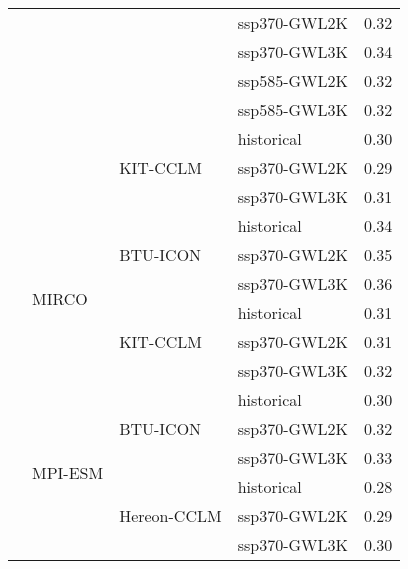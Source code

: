 \begin{table}[!htbp]
{\begin{tabular}{lll|l|r}
 &  &  & ssp370-GWL2K & 0.32 \\
 &  &  & ssp370-GWL3K & 0.34 \\
 &  &  & ssp585-GWL2K & 0.32 \\
 &  &  & ssp585-GWL3K & 0.32 \\
\cmidrule(lr){3-5}
 &  & \multirow{3}{*}{KIT-CCLM} & historical & 0.30 \\
 &  &  & ssp370-GWL2K & 0.29 \\
 &  &  & ssp370-GWL3K & 0.31 \\
\cmidrule(lr){3-5}
\cmidrule(lr){2-5}
 & \multirow{6}{*}{MIRCO} & \multirow{3}{*}{BTU-ICON} & historical & 0.34 \\
 &  &  & ssp370-GWL2K & 0.35 \\
 &  &  & ssp370-GWL3K & 0.36 \\
\cmidrule(lr){3-5}
 &  & \multirow{3}{*}{KIT-CCLM} & historical & 0.31 \\
 &  &  & ssp370-GWL2K & 0.31 \\
 &  &  & ssp370-GWL3K & 0.32 \\
\cmidrule(lr){3-5}
\cmidrule(lr){2-5}
 & \multirow{6}{*}{MPI-ESM} & \multirow{3}{*}{BTU-ICON} & historical & 0.30 \\
 &  &  & ssp370-GWL2K & 0.32 \\
 &  &  & ssp370-GWL3K & 0.33 \\
\cmidrule(lr){3-5}
 &  & \multirow{3}{*}{Hereon-CCLM} & historical & 0.28 \\
 &  &  & ssp370-GWL2K & 0.29 \\
 &  &  & ssp370-GWL3K & 0.30 \\
\bottomrule
\end{tabular}
}
\end{table}
